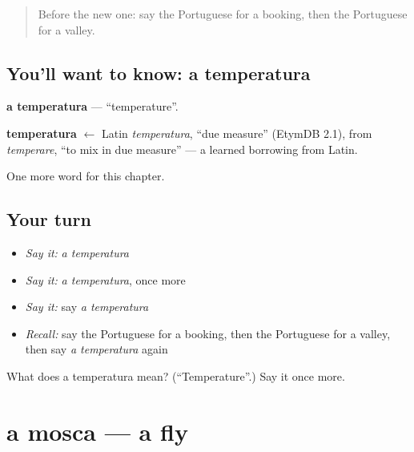\label{lesson:PT-C244-temperatura}



\begin{quote}
Before the new one: say the Portuguese for a booking, then the Portuguese for a valley.
\end{quote}

\subsection*{You'll want to know: a temperatura}
\textbf{a temperatura} — \textquotedblleft{}temperature\textquotedblright{}.

\begin{cousinweb}
\textbf{temperatura} $\leftarrow$ Latin \emph{temperatura}, \textquotedblleft{}due measure\textquotedblright{} (EtymDB 2.1), from \emph{temperare}, \textquotedblleft{}to mix in due measure\textquotedblright{} — a learned borrowing from Latin.
\end{cousinweb}

\begin{grammarlens}[title={What you've built}]
One more word for this chapter.
\end{grammarlens}

\subsection*{Your turn}
\begin{itemize}
\raggedright
  \item \emph{Say it:} \emph{a temperatura}
  \item \emph{Say it:} \emph{a temperatura}, once more
  \item \emph{Say it:} say \emph{a temperatura}
  \item \emph{Recall:} say the Portuguese for a booking, then the Portuguese for a valley, then say \emph{a temperatura} again
\end{itemize}

\begin{tcolorbox}[breakable,colback=teal!4,colframe=teal!35!black,title={Before you move on}]
What does a temperatura mean? (\textquotedblleft{}Temperature\textquotedblright{}.) Say it once more.
\end{tcolorbox}
\section[a mosca]{a mosca — a fly}

